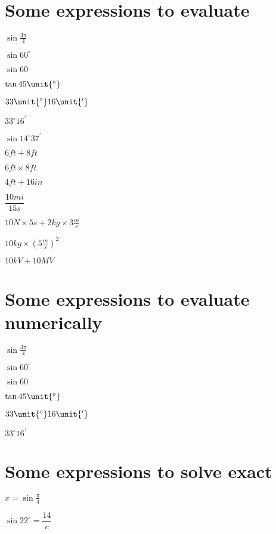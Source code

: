 \documentclass{article}
\begin{document}
\section{Some expressions to evaluate}

$\sin \frac{3\pi }{4}$

$\sin 60^{\circ }$

$\sin 60$

$\tan 45\unit{%
{{}^\circ}%
}$

$33\unit{%
{{}^\circ}%
}16\unit{%
{}^{\prime }%
}$

$33^{\circ }16^{\prime }$

$\sin 14^{\circ }37^{\prime }$

$6\unit{ft}+8\unit{ft}$

$6\unit{ft}\times 8\unit{ft}$

$4\unit{ft}+16\unit{in}$

$\dfrac{10\unit{mi}}{15\unit{s}}$

$10\unit{N}\times 5\unit{s}+2\unit{kg}\times 3\frac{\unit{m}}{\unit{s}}$

$10\unit{kg}\times \left( 5\frac{\unit{m}}{\unit{s}}\right) ^{2}$

$10\unit{kV}+10\unit{MV}$

\section{Some expressions to evaluate numerically}

$\sin \frac{3\pi }{4}$

$\sin 60^{\circ }$

$\sin 60$

$\tan 45\unit{%
{{}^\circ}%
}$

$33\unit{%
{{}^\circ}%
}16\unit{%
{}^{\prime }%
}$

$33^{\circ }16^{\prime }$

\section{Some expressions to solve exact}

$x=\sin \frac{\pi }{4}$

$\sin 22^{\circ }=\dfrac{14}{c}$
\end{document}
